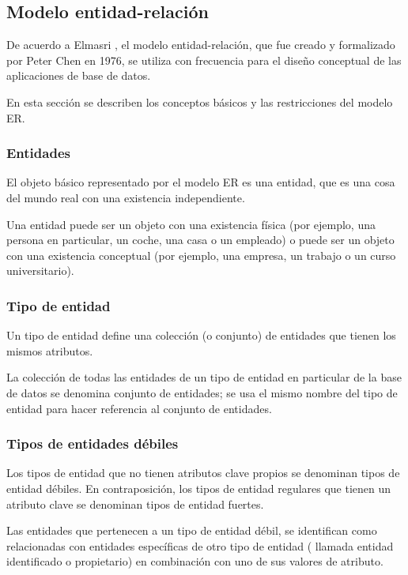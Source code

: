 
\subsection{Modelo entidad-relación}

De acuerdo a Elmasri \cite{ramez_elmasri_fundamentos_nodate}, el modelo entidad-relación, que fue creado y formalizado por Peter Chen en 1976\cite{chen_entity-relationship_nodate}, se utiliza con frecuencia para el diseño conceptual de las aplicaciones de base de datos. 


En esta sección se describen los conceptos básicos y las restricciones del modelo ER. 

\subsubsection{Entidades}
El objeto básico representado por el modelo ER es una entidad, que es una cosa del mundo real con una existencia independiente.


Una entidad puede ser un objeto con una existencia física (por ejemplo, una persona en particular, un coche, una casa o un empleado) o puede ser un objeto con una existencia conceptual (por ejemplo, una empresa, un trabajo o un curso universitario).

\subsubsection*{Tipo de entidad}

Un tipo de entidad define una colección (o conjunto) de entidades que tienen los mismos atributos.


La colección de todas las entidades de un tipo de entidad en particular de la base de datos se denomina conjunto de entidades; se usa el mismo nombre del tipo de entidad para hacer referencia al conjunto de entidades. 

\subsubsection*{Tipos de entidades débiles}

Los tipos de entidad que no tienen atributos clave propios se denominan tipos de entidad débiles. En contraposición, los tipos de entidad regulares que tienen un atributo clave se denominan tipos de entidad fuertes.


Las entidades que pertenecen a un tipo de entidad débil, se identifican como relacionadas con entidades específicas de otro tipo de entidad ( llamada entidad identificado o propietario) en combinación con uno de sus valores de atributo.


